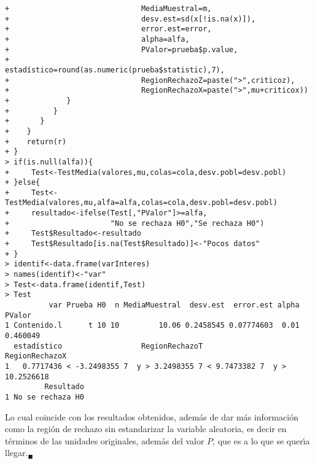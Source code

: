 \begin{solucion}
\begin{verbatim}
+                              MediaMuestral=m,
+                              desv.est=sd(x[!is.na(x)]),
+                              error.est=error,
+                              alpha=alfa,
+                              PValor=prueba$p.value,
+                              estadístico=round(as.numeric(prueba$statistic),7),
+                              RegionRechazoZ=paste(">",criticoz),
+                              RegionRechazoX=paste(">",mu+criticox))
+             }
+          }
+       }
+    }
+    return(r)
+ }
> if(is.null(alfa)){
+     Test<-TestMedia(valores,mu,colas=cola,desv.pobl=desv.pobl)
+ }else{
+     Test<-TestMedia(valores,mu,alfa=alfa,colas=cola,desv.pobl=desv.pobl)
+     resultado<-ifelse(Test[,"PValor"]>=alfa,
+                       "No se rechaza H0","Se rechaza H0")
+     Test$Resultado<-resultado
+     Test$Resultado[is.na(Test$Resultado)]<-"Pocos datos"
+ }
> identif<-data.frame(varInteres)
> names(identif)<-"var"
> Test<-data.frame(identif,Test)
> Test
          var Prueba H0  n MediaMuestral  desv.est  error.est alpha   PValor
1 Contenido.l      t 10 10         10.06 0.2458545 0.07774603  0.01 0.460049
  estadístico                  RegionRechazoT                RegionRechazoX
1   0.7717436 < -3.2498355 7  y > 3.2498355 7 < 9.7473382 7  y > 10.2526618
         Resultado
1 No se rechaza H0
 \end{verbatim}
 \vspace{-0.5cm}
 Lo cual coincide con los resultados obtenidos, adem\'as de dar m\'as informaci\'on como la regi\'on de rechazo sin estandarizar la variable aleatoria, es decir en t\'erminos de las unidades originales, adem\'as del valor $P$, que es a lo que se quer\'{\i}a llegar.${}_{\blacksquare}$
\end{solucion}
